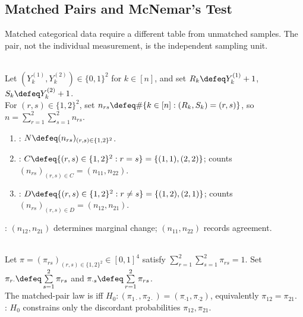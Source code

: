 \subsection{Matched Pairs and McNemar's Test}

Matched categorical data require a different table from unmatched samples. The pair, not the individual measurement, is the independent sampling unit.

\begin{definition} \label{def:matched-pair-binary-table} \\
Let $(Y_k^{(1)},Y_k^{(2)})\in\{0,1\}^2$ for $k\in[n]$, and set $R_k\defeq Y_k^{(1)}+1$, $S_k\defeq Y_k^{(2)}+1$.\\
For $(r,s)\in\{1,2\}^2$, set $n_{rs}\defeq\#\{k\in[n]:(R_k,S_k)=(r,s)\}$, so $n=\sum\limits_{r=1}^{2}\sum\limits_{s=1}^{2}n_{rs}$.
\begin{enumerate}[label=(\roman*)]
\setlength{\itemsep}{0pt}
\item {}: $N\defeq(n_{rs})_{(r,s)\in\{1,2\}^2}$.
\item {}: $C\defeq\{(r,s)\in\{1,2\}^2:r=s\}=\{(1,1),(2,2)\}$; counts $(n_{rs})_{(r,s)\in C}=(n_{11},n_{22})$.
\item {}: $D\defeq\{(r,s)\in\{1,2\}^2:r\ne s\}=\{(1,2),(2,1)\}$; counts $(n_{rs})_{(r,s)\in D}=(n_{12},n_{21})$.
\end{enumerate}
: $(n_{12},n_{21})$ determines marginal change; $(n_{11},n_{22})$ records agreement.
\end{definition}

\begin{definition} \label{def:mcnemars-null} \\
Let $\pi=(\pi_{rs})_{(r,s)\in\{1,2\}^2}\in[0,1]^4$ satisfy $\sum\limits_{r=1}^{2}\sum\limits_{s=1}^{2}\pi_{rs}=1$. Set $\pi_{r\cdot}\defeq\sum\limits_{s=1}^{2}\pi_{rs}$ and $\pi_{\cdot s}\defeq\sum\limits_{r=1}^{2}\pi_{rs}$.\\
The matched-pair law is  iff $H_0:(\pi_{1\cdot},\pi_{2\cdot})=(\pi_{\cdot1},\pi_{\cdot2})$, equivalently $\pi_{12}=\pi_{21}$.\\
: $H_0$ constrains only the discordant probabilities $\pi_{12},\pi_{21}$.
\end{definition}

